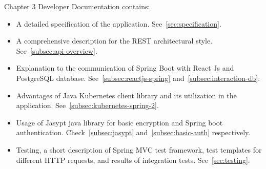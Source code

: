 Chapter 3 Developer Documentation contains:
\begin{itemize}
  \item A detailed specification of the application. See~\autoref{sec:specification}.
  \item A comprehensive description for the REST architectural style.  See~\autoref{subsec:api-overview}.
  \item Explanation to the communication of Spring Boot with React Js and PostgreSQL database. See~\autoref{subsec:reactjs-spring} and~\autoref{subsec:interaction-db}.
  \item Advantages of Java Kubernetes client library and its utilization in the application.  See~\autoref{subsec:kubernetes-spring-2}.
  \item Usage of Jasypt java library for basic encryption and Spring boot authentication. Check~\autoref{subsec:jasypt} and~\autoref{subsec:basic-auth} respectively.
  \item Testing, a short description of Spring MVC test framework, test templates for different HTTP requests, and results of integration tests. See~\autoref{sec:testing}.
\end{itemize}
